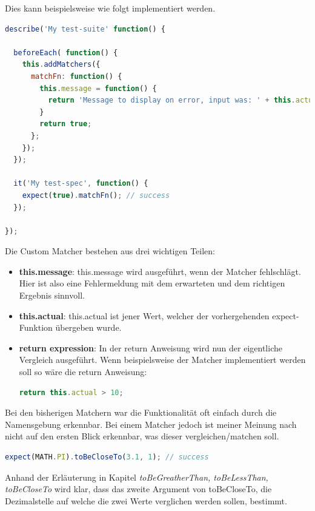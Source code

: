 Dies kann beispielsweise wie folgt implementiert werden.

\begin{lstlisting}[language=JavaScript]
describe('My test-suite' function() {

  beforeEach( function() {
    this.addMatchers({
      matchFn: function() {
        this.message = function() {
          return 'Message to display on error, input was: ' + this.actual;
        }
        return true;
      };
    });
  });

  it('My test-spec', function() {
    expect(true).matchFn(); // success
  });

});
\end{lstlisting}

Die Custom Matcher bestehen aus drei wichtigen Teilen:
\begin{itemize}
  \item \textbf{this.message}: \newline
  this.message wird ausgeführt, wenn der Matcher fehlschlägt. Hier ist also eine Fehlermeldung mit dem erwarteten und dem richtigen Ergebnis sinnvoll.
  \item \textbf{this.actual}: \newline
  this.actual ist jener Wert, welcher der vorhergehenden expect-Funktion übergeben wurde.
  \item \textbf{return expression}: \newline
  In der return Anweisung wird nun der eigentliche Vergleich ausgeführt. Wenn beispielsweise der Matcher  implementiert werden soll so wäre die return Anweisung:
\begin{lstlisting}[language=JavaScript]
return this.actual > 10;
\end{lstlisting}

\end{itemize}


Bei den bisherigen Matchern war die Funktionalität oft einfach durch die Namensgebung erkennbar. Bei einem Matcher jedoch ist meiner Meinung nach nicht auf den ersten Blick erkennbar, was dieser vergleichen/matchen soll.

\begin{lstlisting}[language=JavaScript]
expect(MATH.PI).toBeCloseTo(3.1, 1); // success
\end{lstlisting}

Anhand der Erläuterung in Kapitel \textit{toBeGreatherThan, toBeLessThan, toBeCloseTo} wird klar, dass das zweite Argument von toBeCloseTo, die Dezimalstelle auf welche die zwei Werte verglichen werden sollen, bestimmt.

